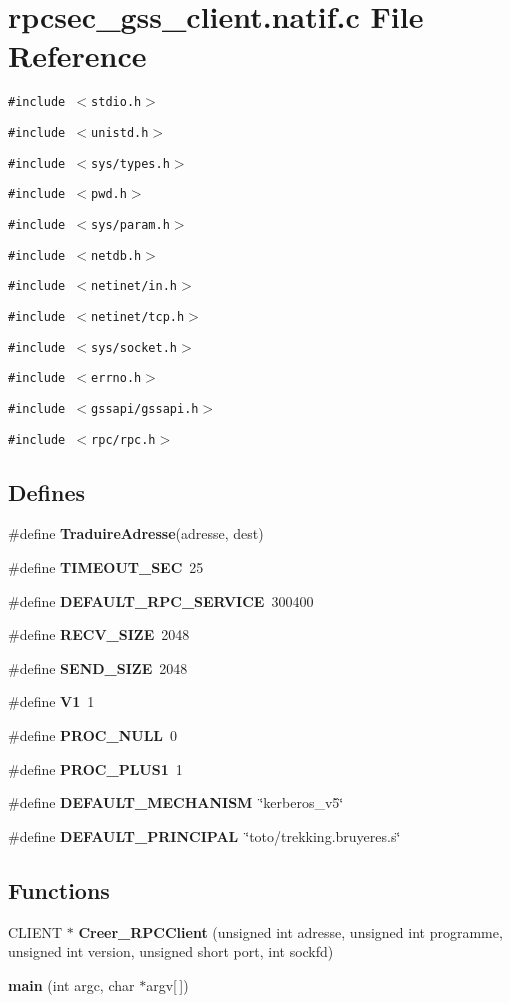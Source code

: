\section{rpcsec\_\-gss\_\-client.natif.c File Reference}
\label{rpcsec__gss__client_8natif_8c}
{\tt \#include $<$stdio.h$>$}\par
{\tt \#include $<$unistd.h$>$}\par
{\tt \#include $<$sys/types.h$>$}\par
{\tt \#include $<$pwd.h$>$}\par
{\tt \#include $<$sys/param.h$>$}\par
{\tt \#include $<$netdb.h$>$}\par
{\tt \#include $<$netinet/in.h$>$}\par
{\tt \#include $<$netinet/tcp.h$>$}\par
{\tt \#include $<$sys/socket.h$>$}\par
{\tt \#include $<$errno.h$>$}\par
{\tt \#include $<$gssapi/gssapi.h$>$}\par
{\tt \#include $<$rpc/rpc.h$>$}\par
\subsection*{Defines}
\begin{CompactItemize}
\item 
\#define {\bf Traduire\-Adresse}(adresse, dest)
\item 
\#define {\bf TIMEOUT\_\-SEC}\ 25
\item 
\#define {\bf DEFAULT\_\-RPC\_\-SERVICE}\ 300400
\item 
\#define {\bf RECV\_\-SIZE}\ 2048
\item 
\#define {\bf SEND\_\-SIZE}\ 2048
\item 
\#define {\bf V1}\ 1
\item 
\#define {\bf PROC\_\-NULL}\ 0
\item 
\#define {\bf PROC\_\-PLUS1}\ 1
\item 
\#define {\bf DEFAULT\_\-MECHANISM}\ \char`\"{}kerberos\_\-v5\char`\"{}
\item 
\#define {\bf DEFAULT\_\-PRINCIPAL}\ \char`\"{}toto/trekking.bruyeres.s\char`\"{}
\end{CompactItemize}
\subsection*{Functions}
\begin{CompactItemize}
\item 
CLIENT $\ast$ {\bf Creer\_\-RPCClient} (unsigned int adresse, unsigned int programme, unsigned int version, unsigned short port, int sockfd)
\item 
{\bf main} (int argc, char $\ast$argv[$\,$])
\end{CompactItemize}
